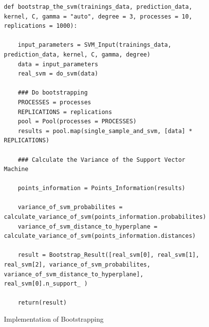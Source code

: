 \documentclass[letterpaper]{article}
\begin{document}
\begin{figure}[!htb]
\begin{center}
\begin{lstlisting}
def bootstrap_the_svm(trainings_data, prediction_data, kernel, C, gamma = "auto", degree = 3, processes = 10, replications = 1000):

    input_parameters = SVM_Input(trainings_data, prediction_data, kernel, C, gamma, degree)
    data = input_parameters
    real_svm = do_svm(data)
    
    ### Do bootstrapping
    PROCESSES = processes
    REPLICATIONS = replications
    pool = Pool(processes = PROCESSES)
    results = pool.map(single_sample_and_svm, [data] * REPLICATIONS)
        
    ### Calculate the Variance of the Support Vector Machine
    
    points_information = Points_Information(results)
    
    variance_of_svm_probabilites = calculate_variance_of_svm(points_information.probabilites)
    variance_of_svm_distance_to_hyperplane = calculate_variance_of_svm(points_information.distances)
    
    result = Bootstrap_Result([real_svm[0], real_svm[1], real_svm[2], variance_of_svm_probabilites, variance_of_svm_distance_to_hyperplane], real_svm[0].n_support_ )
        
    return(result)
\end{lstlisting}
\caption{Implementation of Bootstrapping}
\label{fig1}
\end{center}
\end{figure}
\end{document}
